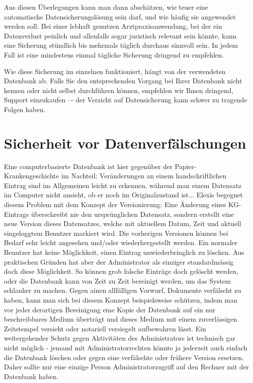 Aus diesen Überlegungen kann man dann abschätzen, wie teuer eine automatische
Datensicherungslösung sein darf, und wie häufig sie angewendet werden soll.
Bei einer lebhaft genutzen Arztpraxisanwendung, bei der ein Datenverlust peinlich und
allenfalls sogar juristisch relevant sein könnte, kann eine Sicherung stündlich bis mehrmals
täglich durchaus sinnvoll sein. In jedem Fall ist eine mindestens einmal tägliche Sicherung
dringend zu empfehlen.

Wie diese Sicherung im einzelnen funktioniert, hängt von der verwendeten Datenbank ab.
Falls Sie den entsprechenden Vorgang bei Ihrer Datenbank nicht kennen oder nicht selbst
durchführen können, empfehlen wir Ihnen dringend, Support einzukaufen –- der Verzicht auf
Datensicherung kann schwer zu tragende Folgen haben.

\section{Sicherheit vor Datenverfälschungen}

Eine computerbasierte Datenbank ist hier gegenüber der Papier-Krankengeschichte im Nachteil:
Veränderungen an einem handschriftlichen Eintrag sind im Allgemeinen leicht zu erkennen, während
man einem Datensatz im Computer nicht ansieht, ob er noch im Originalzustand ist... Elexis
begegnet diesem Problem mit dem Konzept der Versionierung: Eine Änderung eines KG-Eintrags
überschreibt nie den ursprünglichen Datensatz, sondern erstellt eine neue Version dieses
Datensatzes, welche mit aktuellem Datum, Zeit und aktuell eingeloggtem Benutzer markiert wird.
Die vorherigen Versionen können bei Bedarf sehr leicht angesehen und/oder wiederhergestellt werden.
Ein normaler Benutzer hat keine Möglichkeit, einen Eintrag unwiederbringlich zu löschen.
Aus praktischen Gründen hat aber der Administrator als einziger standardmässig doch diese
Möglichkeit. So können grob falsche Einträge doch gelöscht werden, oder die Datenbank kann von
Zeit zu Zeit bereinigt werden, um das System schlanker zu machen. Gegen ainen allfälligen Vorwurf,
Dokumente verfälscht zu haben, kann man sich bei diesem Konzept beispielsweise schützen, indem man
vor jeder derartigen Bereinigung eine Kopie der Datenbank auf ein nur beschreibbares Medium
überträgt und dieses Medium mit einem zuverlässigen Zeitstempel versieht oder notariell versiegelt
aufbewahren lässt. Ein weitergehender Schutz gegen Aktivitäten des Administrators ist technisch gar
nicht möglich - jemand mit Administratorrechten könnte ja jederzeit auch einfach die Datenbank
löschen oder gegen eine verfälschte oder frühere Version ersetzen. Daher sollte nur eine einzige
Person Administratorzugriff auf den Rechner mit der Datenbank haben.

